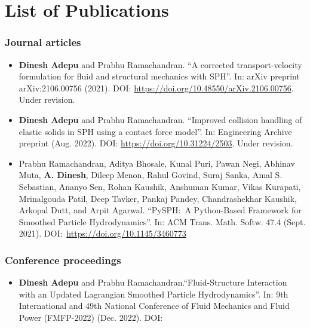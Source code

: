 \chapter{List of Publications}%
\label{chap:lop}

\subsection*{Journal articles}

\begin{itemize}
\item \textbf{Dinesh Adepu} and Prabhu Ramachandran. ``A corrected
  transport-velocity formulation for fluid and structural mechanics with
  SPH''. In: arXiv preprint arXiv:2106.00756
  (2021). DOI: \url{https://doi.org/10.48550/arXiv.2106.00756}. Under revision.


\item \textbf{Dinesh Adepu} and Prabhu Ramachandran. ``Improved collision
  handling of elastic solids in SPH using a contact force model''. In:
  Engineering Archive preprint
  (Aug. 2022). DOI: \url{https://doi.org/10.31224/2503}. Under revision.

\item Prabhu Ramachandran, Aditya Bhosale, Kunal Puri, Pawan Negi, Abhinav Muta,
  \textbf{A. Dinesh}, Dileep Menon, Rahul Govind, Suraj Sanka, Amal S. Sebastian, Ananyo
  Sen, Rohan Kaushik, Anshuman Kumar, Vikas Kurapati, Mrinalgouda Patil, Deep
  Tavker, Pankaj Pandey, Chandrashekhar Kaushik, Arkopal Dutt, and Arpit
  Agarwal. ``PySPH:~A Python-Based Framework for Smoothed Particle
  Hydrodynamics''. In: ACM Trans. Math. Softw. 47.4
  (Sept. 2021). DOI:~\url{https://doi.org/10.1145/3460773}
\end{itemize}


\subsection*{Conference proceedings}
\label{sec:conf-proc}
\begin{itemize}
\item \textbf{Dinesh Adepu} and Prabhu Ramachandran.``Fluid-Structure
  Interaction with an Updated Lagrangian Smoothed Particle Hydrodynamics''. In:
  9th International and 49th National Conference of Fluid Mechanics and Fluid
  Power (FMFP-2022) (Dec. 2022). DOI:
\end{itemize}
